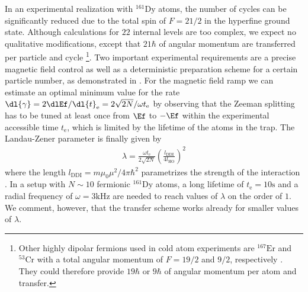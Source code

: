 In an experimental realization with $^{161}\text{Dy}$ atoms, the number of cycles can be significantly reduced due to the total spin of $F=21/2$ in the hyperfine ground state. Although calculations for $22$ internal levels are too complex, we expect no qualitative modifications, except that $21\hbar$ of angular momentum are transferred per particle and cycle \footnote{Other highly dipolar fermions used in cold atom experiments are $^{167}\text{Er}$ and $^{53}\text{Cr}$ with a total angular momentum of $F=19/2$ and $9/2$, respectively \cite{Berglund2007,Chicireanu2006}. They could therefore provide $19\hbar$ or $9\hbar$ of angular momentum per atom and transfer.}. Two important experimental requirements are a precise magnetic field control \cite{Pasquiou2011} as well as a deterministic preparation scheme for a certain particle number, as demonstrated in \cite{Serwane2011}. For the magnetic field ramp we can estimate an optimal minimum value for the rate $\dl{\gamma}=2\dlEf/\dl{t}_\text{e}=2\sqrt{2N}/\omega t_\text{e}$ by observing that the Zeeman splitting has to be tuned at least once from $\Ef$ to $-\Ef$ within the experimental accessible time $t_\text{e}$, which is limited by the lifetime of the atoms in the trap. The Landau-Zener parameter is finally given by
\begin{align*}
\lambda = \frac{\omega t_\text{e}}{2\sqrt{2N}} \left(\frac{l_\text{DDI}}{4 l_\text{HO}}\right)^2
\end{align*}
where the length $l_\text{DDI} = m\mu_0\mu^2/4\pi \hbar^2$ parametrizes the strength of the interaction \cite{Lu2012}. In a setup with $N\sim 10$ fermionic $^{161}\text{Dy}$ atoms, a long lifetime of $t_\text{e}=10\text{s}$ and a radial frequency of $\omega = 3\text{kHz}$ are needed to reach values of $\lambda$ on the order of $1$. We comment, however, that the transfer scheme works already for smaller values of $\lambda$.



